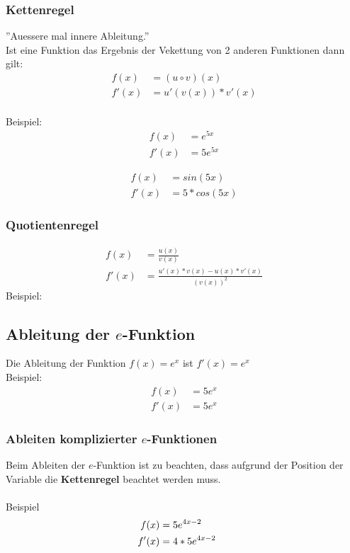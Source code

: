\documentclass[a4paper]{article} %
\begin{document}
	\subsubsection{Kettenregel}
	''Auessere mal innere Ableitung.''\\
	Ist eine Funktion das Ergebnis der Vekettung von 2 anderen Funktionen dann gilt:\\
	 \begin{align*}
		f(x)&=(u \circ v)(x)\\
		f'(x)&=u'(v(x))*v'(x)
	\end{align*}
	\\Beispiel:\\
		\begin{align*}
		f(x) &=e^{5x}\\
		f'(x)&=5e^{5x}
		\end{align*}

		\begin{align*}
		f(x)&=sin(5x)\\
		f'(x)&=5*cos(5x)
		\end{align*}

	\subsubsection{Quotientenregel}
		\begin{align*}
		f(x)&=\frac{u(x)}{v(x)}\\
		f'(x)&=\frac{u'(x)*v(x)-u(x)*v'(x)}{(v(x))^2}
		\end{align*}
		Beispiel: \\

	\subsection{Ableitung der $e$-Funktion}
	Die Ableitung der Funktion $f(x)=e^x$ ist $f'(x)=e^x$
	\\Beispiel:\\
	\begin{align*}
		f(x)&=5e^x\\
		f'(x)&=5e^x
	\end{align*}
	\subsubsection{Ableiten komplizierter $e$-Funktionen}
	Beim Ableiten der $e$-Funktion ist zu beachten, dass aufgrund der Position der Variable die \textbf{Kettenregel}
	beachtet werden muss.\\\\
	Beispiel
	\\\begin{align*}
	f(x)&=5e^{4x-2}\\
	f'(x) &=4*5e^{4x-2} \hspace{0.5cm}
	\end{align*}
\end{document}
